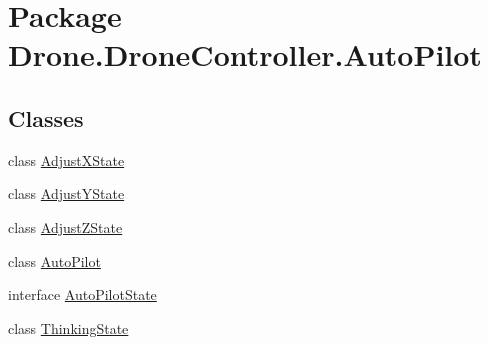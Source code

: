 \hypertarget{namespace_drone_1_1_drone_controller_1_1_auto_pilot}{}\section{Package Drone.\+Drone\+Controller.\+Auto\+Pilot}
\label{namespace_drone_1_1_drone_controller_1_1_auto_pilot}
\subsection*{Classes}
\begin{DoxyCompactItemize}
\item 
class \hyperlink{class_drone_1_1_drone_controller_1_1_auto_pilot_1_1_adjust_x_state}{Adjust\+X\+State}
\item 
class \hyperlink{class_drone_1_1_drone_controller_1_1_auto_pilot_1_1_adjust_y_state}{Adjust\+Y\+State}
\item 
class \hyperlink{class_drone_1_1_drone_controller_1_1_auto_pilot_1_1_adjust_z_state}{Adjust\+Z\+State}
\item 
class \hyperlink{class_drone_1_1_drone_controller_1_1_auto_pilot_1_1_auto_pilot}{Auto\+Pilot}
\item 
interface \hyperlink{interface_drone_1_1_drone_controller_1_1_auto_pilot_1_1_auto_pilot_state}{Auto\+Pilot\+State}
\item 
class \hyperlink{class_drone_1_1_drone_controller_1_1_auto_pilot_1_1_thinking_state}{Thinking\+State}
\end{DoxyCompactItemize}
